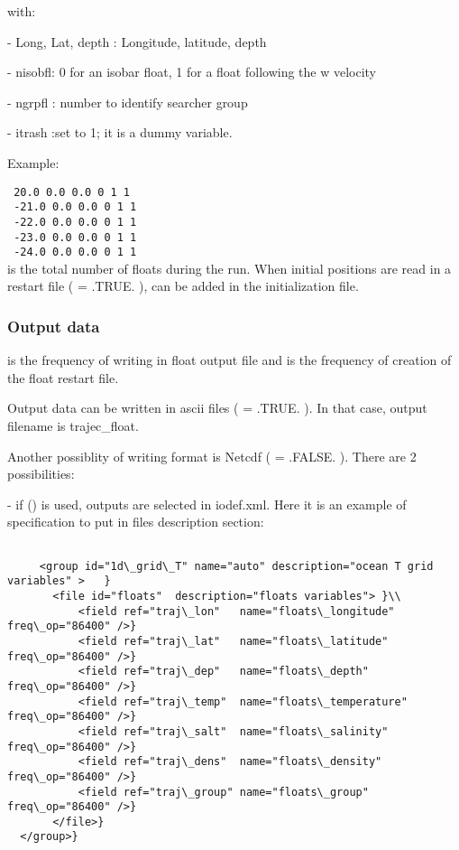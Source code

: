 \documentclass[NEMO_book]{subfiles}
\begin{document}
\noindent with:

 - Long, Lat, depth  : Longitude, latitude, depth

 - nisobfl: 0 for an isobar float, 1 for a float following the w velocity

 - ngrpfl : number to identify searcher group

 - itrash :set to 1; it is a dummy variable.

\noindent Example:

\noindent\texttt{  20.0 0.0 0.0 0 1 1 }\\
\texttt{ -21.0 0.0 0.0 0 1 1 }\\
\texttt{ -22.0 0.0 0.0 0 1 1 }\\
\texttt{ -23.0 0.0 0.0 0 1 1 }\\
\texttt{ -24.0 0.0 0.0 0 1 1 }\\

 is the total number of floats during the run.
When initial positions are read in a restart file ( = .TRUE. ),  
can be added in the initialization file. 

\subsubsection{ Output data }

 is the frequency of writing in float output file and  
is the frequency of creation of the float restart file.

Output data can be written in ascii files ( = .TRUE. ). In that case, 
output filename is trajec\_float.

Another possiblity of writing format is Netcdf ( = .FALSE. ). There are 2 possibilities:

 - if () is used, outputs are selected in  iodef.xml. Here it is an example of specification 
   to put in files description section:

\vspace{-30pt}
\begin{alltt}  {{\scriptsize
\begin{verbatim}

     <group id="1d\_grid\_T" name="auto" description="ocean T grid variables" >   }
       <file id="floats"  description="floats variables"> }\\
           <field ref="traj\_lon"   name="floats\_longitude"   freq\_op="86400" />}
           <field ref="traj\_lat"   name="floats\_latitude"    freq\_op="86400" />}
           <field ref="traj\_dep"   name="floats\_depth"       freq\_op="86400" />}
           <field ref="traj\_temp"  name="floats\_temperature" freq\_op="86400" />}
           <field ref="traj\_salt"  name="floats\_salinity"    freq\_op="86400" />}
           <field ref="traj\_dens"  name="floats\_density"     freq\_op="86400" />}
           <field ref="traj\_group" name="floats\_group"       freq\_op="86400" />}
       </file>}
  </group>}

\end{verbatim}
}}\end{alltt}
\end{document}
